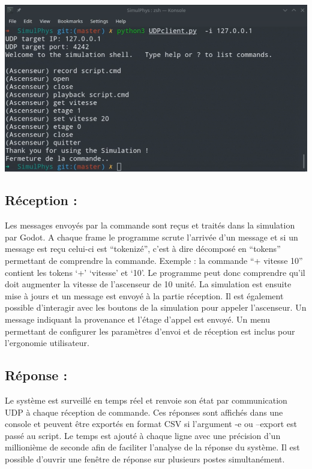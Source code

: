\documentclass[12pt]{article}
\begin{document}
\begin{center}\includegraphics[scale=0.4]{commande.png}\end{center}

\subsection{Réception :}

Les messages envoyés par la commande sont reçus et traités dans la simulation par Godot. 
\newline
A chaque frame le programme scrute l’arrivée d’un message et si un message est reçu celui-ci est “tokenizé”, c’est à dire décomposé en “tokens” permettant de comprendre la commande. Exemple  : la commande “+ vitesse 10” contient les tokens ‘+’ ‘vitesse’ et ‘10’. Le programme peut donc comprendre qu’il doit augmenter la vitesse de l’ascenseur de 10 unité.
\newline
La simulation est ensuite mise à jours et un message est envoyé à la partie réception.
Il est également possible d’interagir avec les boutons de la simulation pour appeler l’ascenseur. Un message indiquant la provenance et l’étage d’appel est envoyé.
\newline
Un menu permettant de configurer les paramètres d’envoi et de réception est inclus pour l’ergonomie utilisateur.
\newpage
\subsection{Réponse :}

Le système est surveillé en temps réel et renvoie son état par communication UDP à chaque réception de commande. Ces réponses sont affichés dans une console et peuvent être exportés en format CSV si l’argument -e ou --export est passé au script.
\newline
Le temps est ajouté à chaque ligne avec une précision d’un millionième de seconde afin de faciliter l’analyse de la réponse du système. 
\newline
Il est possible d’ouvrir une fenêtre de réponse sur plusieurs postes simultanément.
\end{document}
